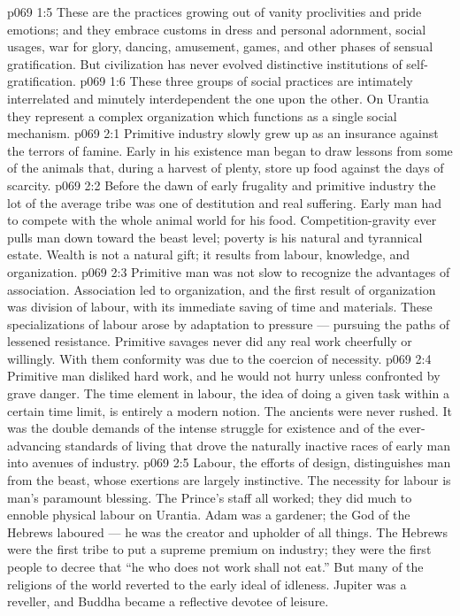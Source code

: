\vs p069 1:5 \bibnobreakspace {} These are the practices growing out of vanity proclivities and pride emotions; and they embrace customs in dress and personal adornment, social usages, war for glory, dancing, amusement, games, and other phases of sensual gratification. But civilization has never evolved distinctive institutions of self\hyp{}gratification.
\vs p069 1:6 \pc These three groups of social practices are intimately interrelated and minutely interdependent the one upon the other. On Urantia they represent a complex organization which functions as a single social mechanism.
\vs p069 2:1 Primitive industry slowly grew up as an insurance against the terrors of famine. Early in his existence man began to draw lessons from some of the animals that, during a harvest of plenty, store up food against the days of scarcity.
\vs p069 2:2 Before the dawn of early frugality and primitive industry the lot of the average tribe was one of destitution and real suffering. Early man had to compete with the whole animal world for his food. Competition\hyp{}gravity ever pulls man down toward the beast level; poverty is his natural and tyrannical estate. Wealth is not a natural gift; it results from labour, knowledge, and organization.
\vs p069 2:3 Primitive man was not slow to recognize the advantages of association. Association led to organization, and the first result of organization was division of labour, with its immediate saving of time and materials. These specializations of labour arose by adaptation to pressure --- pursuing the paths of lessened resistance. Primitive savages never did any real work cheerfully or willingly. With them conformity was due to the coercion of necessity.
\vs p069 2:4 Primitive man disliked hard work, and he would not hurry unless confronted by grave danger. The time element in labour, the idea of doing a given task within a certain time limit, is entirely a modern notion. The ancients were never rushed. It was the double demands of the intense struggle for existence and of the ever\hyp{}advancing standards of living that drove the naturally inactive races of early man into avenues of industry.
\vs p069 2:5 Labour, the efforts of design, distinguishes man from the beast, whose exertions are largely instinctive. The necessity for labour is man’s paramount blessing. The Prince’s staff all worked; they did much to ennoble physical labour on Urantia. Adam was a gardener; the God of the Hebrews laboured --- he was the creator and upholder of all things. The Hebrews were the first tribe to put a supreme premium on industry; they were the first people to decree that “he who does not work shall not eat.” But many of the religions of the world reverted to the early ideal of idleness. Jupiter was a reveller, and Buddha became a reflective devotee of leisure.
